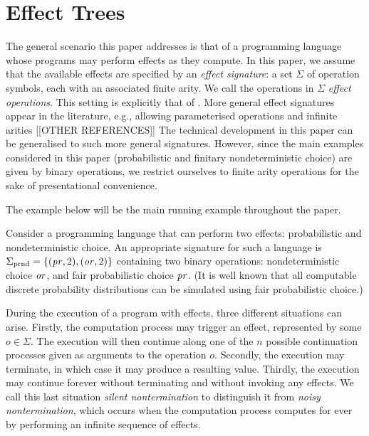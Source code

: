 \section{Effect Trees}
\label{section:trees}

The general scenario this paper addresses is that of a programming language whose programs may perform effects as they compute. In this paper, we assume that the available effects are  specified 
by  an \emph{effect signature}: a set $\Sigma$ of operation symbols, each with an associated finite arity. We call the operations in $\Sigma$ \emph{effect operations}. This setting is explicitly that of \cite{plotkin2001adequacy}.
More general effect signatures appear in the literature, e.g., allowing parameterised operations and infinite arities
\cite{gom} [[OTHER REFERENCES]] The technical development in this paper can be generalised to such
more general signatures. However, since the main examples considered in this paper (probabilistic and finitary nondeterministic choice) are given by binary operations, we restrict ourselves to finite arity operations 
for the sake of presentational convenience.

The example below will be the main running example throughout the paper.
\begin{example}
\label{example:prnd}
    Consider a programming language that can perform two effects: probabilistic and nondeterministic choice.
    An appropriate signature for such a language is 
    $\Sigma_{\text{prnd}} = \{ (\operatorname{\mathit{pr}},2), (\operatorname{\mathit{or}},2) \}$ containing two binary operations:
    nondeterministic choice $\operatorname{\mathit{or}}$, 
    and fair probabilistic choice $\operatorname{\mathit{pr}}$. (It is well known that all computable discrete probability distributions can be 
     simulated using fair probabilistic choice.)
 \end{example}

During the execution of a program with effects, three different situations can arise. Firstly, the computation process may
trigger an effect, represented by some $o \in \Sigma$. The execution will then continue along one of the $n$ possible continuation processes given as arguments to the operation $o$. Secondly, the execution may terminate, 
in which case it may produce a resulting value. 
Thirdly, the execution may continue forever without terminating and without invoking any effects. We call this last situation
 \emph{silent nontermination} to distinguish it from \emph{noisy nontermination}, which occurs
 when the computation process computes for ever by performing an infinite sequence of effects.

